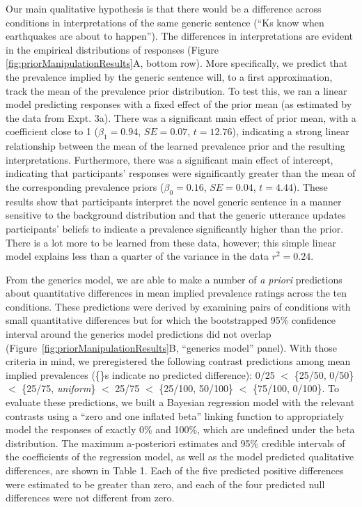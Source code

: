 \documentclass[floatsintext,doc]{apa6}
\theoremstyle{definition}
\theoremstyle{definition}
\theoremstyle{definition}
\theoremstyle{remark}
\begin{document}
Our main qualitative hypothesis is that there would be a difference
across conditions in interpretations of the same generic sentence
(\enquote{Ks know when earthquakes are about to happen}). The
differences in interpretations are evident in the empirical
distributions of responses (Figure \ref{fig:priorManipulationResults}A,
bottom row). More specifically, we predict that the prevalence implied
by the generic sentence will, to a first approximation, track the mean
of the prevalence prior distribution. To test this, we ran a linear
model predicting responses with a fixed effect of the prior mean (as
estimated by the data from Expt. 3a). There was a significant main
effect of prior mean, with a coefficient close to 1 (\(\beta_1 = 0.94\),
\(SE=0.07\), \(t = 12.76\)), indicating a strong linear relationship
between the mean of the learned prevalence prior and the resulting
interpretations. Furthermore, there was a significant main effect of
intercept, indicating that participants' responses were significantly
greater than the mean of the corresponding prevalence priors
(\(\beta_0 = 0.16\), \(SE=0.04\), \(t = 4.44\)). These results show that
participants interpret the novel generic sentence in a manner sensitive
to the background distribution and that the generic utterance updates
participants' beliefs to indicate a prevalence significantly higher than
the prior. There is a lot more to be learned from these data, however;
this simple linear model explains less than a quarter of the variance in
the data \(r^2 = 0.24\).

From the generics model, we are able to make a number of \emph{a priori}
predictions about quantitative differences in mean implied prevalence
ratings across the ten conditions. These predictions were derived by
examining pairs of conditions with small quantitative differences but
for which the bootstrapped 95\% confidence interval around the generics
model predictions did not overlap
(Figure~\ref{fig:priorManipulationResults}B, \enquote{generics model}
panel). With those criteria in mind, we preregistered the following
contrast predictions among mean implied prevalences (\{\}s indicate no predicted difference): 0/25
\(<\) \{25/50, 0/50\} \(<\) \{25/75, \emph{uniform}\} \(<\) 25/75 \(<\)
\{25/100, 50/100\} \(<\) \{75/100, 0/100\}. To evaluate these
predictions, we built a Bayesian regression model with the relevant
contrasts using a \enquote{zero and one inflated beta} linking function
to appropriately model the responses of exactly 0\% and 100\%, which are
undefined under the beta distribution. The maximum a-posteriori
estimates and 95\% credible intervals of the coefficients of the
regression model, as well as the model predicted qualitative
differences, are shown in Table 1. Each of the five predicted positive
differences were estimated to be greater than zero, and each of the four
predicted null differences were not different from zero.
\end{document}
